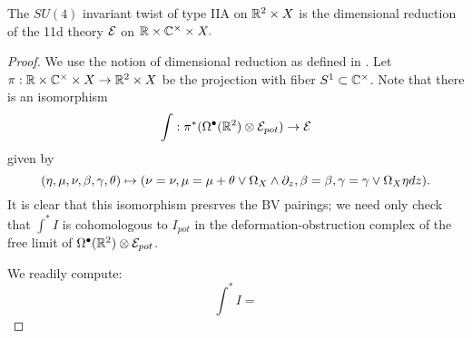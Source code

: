 \begin{prop}
The $SU(4)$ invariant twist of type IIA on $\mathbb{R}^{2}\times X$ is the dimensional reduction of the 11d theory $\mathcal E$ on $\mathbb{R}\times \mathbb{C}^{\times}\times X.$
\end{prop}
\begin{proof}
We use the notion of dimensional reduction as defined in \cite{}.
Let $\pi : \mathbb{R}\times \mathbb{C}^{\times}\times X \to \mathbb{R}^{2}\times X$ be the projection with fiber $S^{1}\subset \mathbb{C}^{\times}$. Note that there is an isomorphism \[\int: \pi^{*}(\Omega^{\bullet}(\mathbb{R}^{2})\otimes \mathcal E_{pot})\to \mathcal E\] given by \[(\eta, \mu, \nu, \beta,\gamma,\theta)\mapsto (\nu = \nu, \mu = \mu + \theta \vee \Omega_{X} \wedge\partial_{z}, \beta = \beta, \gamma = \gamma\vee \Omega_{X} \eta dz ).\] It is clear that this isomorphism presrves the BV pairings; we need only check that $\int^{*} I$ is cohomologous to $I_{pot}$ in the deformation-obstruction complex of the free limit of $\Omega^{\bullet}(\mathbb{R}^{2})\otimes \mathcal E_{pot}$.

We readily compute:
\[\int^{*}I = \]
\end{proof}
